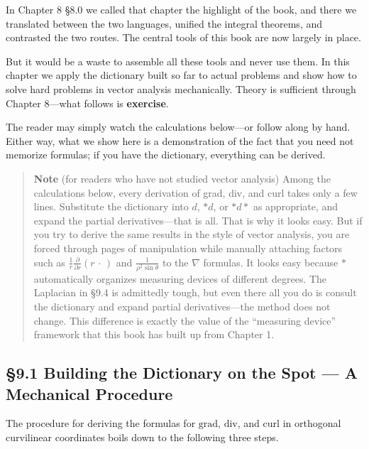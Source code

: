 \documentclass[a4paper,12pt,openany]{book}
\begin{document}
In Chapter 8 §8.0 we called that chapter the highlight of the book, and
there we translated between the two languages, unified the integral
theorems, and contrasted the two routes. The central tools of this book
are now largely in place.

But it would be a waste to assemble all these tools and never use them.
In this chapter we apply the dictionary built so far to actual problems
and show how to solve hard problems in vector analysis mechanically.
Theory is sufficient through Chapter 8—what follows is
\textbf{exercise}.

The reader may simply watch the calculations below—or follow along by
hand. Either way, what we show here is a demonstration of the fact that
you need not memorize formulas; if you have the dictionary, everything
can be derived.

\begin{quote}
\textbf{Note} (for readers who have not studied vector analysis) Among
the calculations below, every derivation of grad, div, and curl takes
only a few lines. Substitute the dictionary into \(d\), \(\ast d\), or
\(\ast d\ast\) as appropriate, and expand the partial derivatives—that
is all. That is why it looks easy. But if you try to derive the same
results in the style of vector analysis, you are forced through pages of
manipulation while manually attaching factors such as
\(\frac{1}{r}\frac{\partial}{\partial r}(r\,\cdot\,)\) and
\(\frac{1}{\rho^2\sin\theta}\) to the \(\nabla\) formulas. It looks easy
because \(\ast\) automatically organizes measuring devices of different
degrees. The Laplacian in §9.4 is admittedly tough, but even there all
you do is consult the dictionary and expand partial derivatives—the
method does not change. This difference is exactly the value of the
``measuring device'' framework that this book has built up from Chapter
1.
\end{quote}

\par\vspace{0.35em}\par

\hypertarget{building-the-dictionary-on-the-spot-a-mechanical-procedure}{%
\subsection{§9.1 Building the Dictionary on the Spot — A Mechanical
Procedure}\label{building-the-dictionary-on-the-spot-a-mechanical-procedure}}

The procedure for deriving the formulas for \(\mathrm{grad}\),
\(\mathrm{div}\), and \(\mathrm{curl}\) in orthogonal curvilinear
coordinates boils down to the following three steps.
\end{document}
